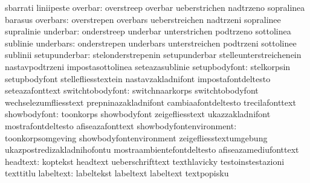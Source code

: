                                  sbarrati                         liniipeste
                         overbar: overstreep                       overbar
                                  ueberstrichen                    nadtrzeno
                                  sopralinea                       barasus
                        overbars: overstrepen                      overbars
                                  ueberstreichen                   nadtrzeni
                                  sopralinee                       supralinie
                        underbar: onderstreep                      underbar
                                  unterstrichen                    podtrzeno
                                  sottolinea                       sublinie
                       underbars: onderstrepen                     underbars
                                  unterstreichen                   podtrzeni
                                  sottolinee                       sublinii
                   setupunderbar: stelonderstrepenin               setupunderbar
                                  stelleunterstreichenein          nastavpodtrzeni
                                  impostasottolinea                seteazasublinie
                   setupbodyfont: stelkorpsin                      setupbodyfont
                                  stellefliesstextein              nastavzakladnifont
                                  impostafontdeltesto              seteazafonttext
                switchtobodyfont: switchnaarkorps                  switchtobodyfont
                                  wechselezumfliesstext            prepninazakladnifont
                                  cambiaafontdeltesto              trecilafonttext
                    showbodyfont: toonkorps                        showbodyfont
                                  zeigefliesstext                  ukazzakladnifont
                                  mostrafontdeltesto               afiseazafonttext
         showbodyfontenvironment: toonkorpsomgeving                showbodyfontenvironment
                                  zeigefliesstextumgebung          ukazpostredizakladnihofontu
                                  mostraambientefontdeltesto       afiseazamediufonttext
                        headtext: koptekst                         headtext
                                  ueberschrifttext                 texthlavicky
                                  testoinstestazioni               texttitlu
                       labeltext: labeltekst                       labeltext
                                  labeltext                        textpopisku
